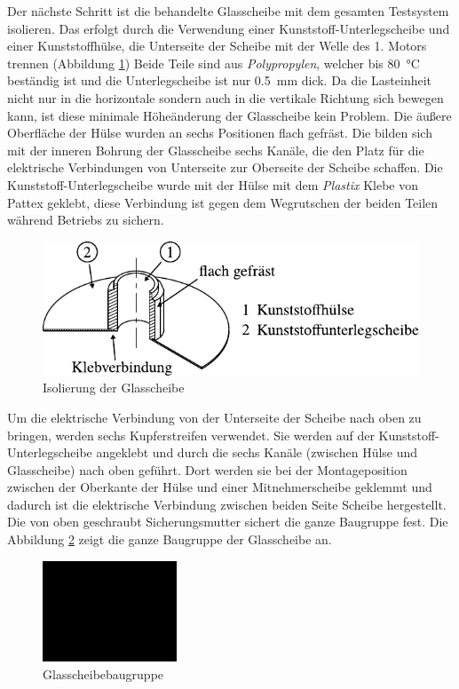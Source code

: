 Der nächste Schritt ist die behandelte Glasscheibe mit dem gesamten Testsystem isolieren.
Das erfolgt durch die Verwendung einer Kunststoff-Unterlegscheibe und einer Kunststoffhülse, die Unterseite der Scheibe mit der Welle des 1. Motors trennen (Abbildung \ref{fig:isolierung_der_glassscheibe})
Beide Teile sind aus \textit{Polypropylen}, welcher bis \SI{80}{\degreeCelsius} beständig ist und die Unterlegscheibe ist nur \SI{0.5}{\milli\meter} dick.
Da die Lasteinheit nicht nur in die horizontale sondern auch in die vertikale Richtung sich bewegen kann, ist diese minimale Höheänderung der Glasscheibe kein Problem.
Die äußere Oberfläche der Hülse wurden an sechs Positionen flach gefräst. Die bilden sich mit der inneren Bohrung der Glasscheibe sechs Kanäle, die den Platz für die elektrische Verbindungen von Unterseite zur Oberseite der Scheibe schaffen.
Die Kunststoff-Unterlegscheibe wurde mit der Hülse mit dem \textit{Plastix} Klebe von Pattex geklebt, diese Verbindung ist gegen dem Wegrutschen der beiden Teilen während Betriebs zu sichern.
\begin{figure}[htb]
    \centering
    \includegraphics[]{./images/isolierung_der_scheibe.pdf}
    \caption{Isolierung der Glasscheibe}
    \label{fig:isolierung_der_glassscheibe}
\end{figure}
%

Um die elektrische Verbindung von der Unterseite der Scheibe nach oben zu bringen, werden sechs Kupferstreifen verwendet.
Sie werden auf der Kunststoff-Unterlegscheibe angeklebt und durch die sechs Kanäle (zwischen Hülse und Glasscheibe) nach oben geführt.
Dort werden sie bei der Montageposition zwischen der Oberkante der Hülse und einer Mitnehmerscheibe geklemmt und dadurch ist die elektrische Verbindung zwischen beiden Seite Scheibe hergestellt.
Die von oben geschraubt Sicherungsmutter sichert die ganze Baugruppe fest.
Die Abbildung \ref{fig:glasscheibebaugruppe} zeigt die ganze Baugruppe der Glasscheibe an.
\begin{figure}[htb]
    \centering
    \includegraphics[width=4cm]{./images/blank_img.jpg}
    \caption{Glasscheibebaugruppe}
    \label{fig:glasscheibebaugruppe}
\end{figure}
%

